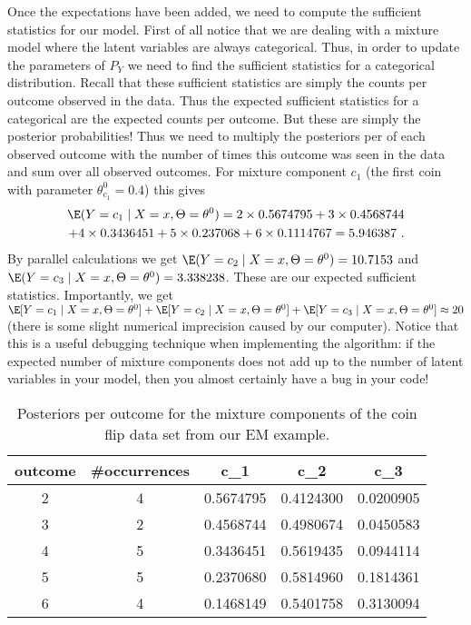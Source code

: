 Once the expectations have been added, we need to compute the sufficient statistics for our model. First of all notice that we are dealing with
a mixture model where the latent variables are always categorical. Thus, in order to update the parameters of $ P_{Y} $ we need to find the
sufficient statistics for a categorical distribution. Recall that these sufficient statistics are simply the counts per outcome observed in
the data. Thus the expected sufficient statistics for a categorical are the expected counts per outcome. But these are simply the posterior
probabilities! Thus we need to multiply the posteriors per of each observed outcome with the number of times this outcome was
seen in the data and sum over all observed outcomes. For mixture component $ c_{1} $ (the first coin with parameter $ \theta^{0}_{c_{1}} = 0.4 $) this gives
\begin{align}
\E(Y = c_{1} \mid X=x,\Theta= \theta^{0}) = 2 \times 0.5674795 + 3 \times 0.4568744 \label{eq:c1Expectation} \\ 
+ 4 \times 0.3436451 + 5 \times 0.237068 + 6 \times 0.1114767 = 5.946387 \nonumber \ .
\end{align}
By parallel calculations we get $ \E(Y = c_{2}\mid X=x,\Theta= \theta^{0}) = 10.7153 $ and $ \E(Y = c_{3}\mid X=x,\Theta= \theta^{0}) = 3.338238 $. 
These are our expected sufficient statistics. Importantly, we get 
$ \E[Y = c_{1}\mid X=x,\Theta= \theta^{0}] + \E[Y = c_{2}\mid X=x,\Theta= \theta^{0}] + \E[Y = c_{3}\mid X=x,\Theta= \theta^{0}] \approx 20 $ (there is some slight numerical imprecision
caused by our computer). Notice that this is a useful debugging technique when implementing the algorithm: if the expected number of mixture components
does not add up to the number of latent variables in your model, then you almost certainly have a bug in your code!

\begin{table}
\center

\begin{tabular}{c|c|c|c|c}
\hline
outcome & \#occurrences & c\_1 & c\_2 & c\_3\\
\hline
2 & 4 & 0.5674795 & 0.4124300 & 0.0200905\\
\hline
3 & 2 & 0.4568744 & 0.4980674 & 0.0450583\\
\hline
4 & 5 & 0.3436451 & 0.5619435 & 0.0944114\\
\hline
5 & 5 & 0.2370680 & 0.5814960 & 0.1814361\\
\hline
6 & 4 & 0.1468149 & 0.5401758 & 0.3130094\\
\hline
\end{tabular}


\caption{Posteriors per outcome for the mixture components of the coin flip data set from our EM example.}
\label{tab:posteriors}
\end{table}

